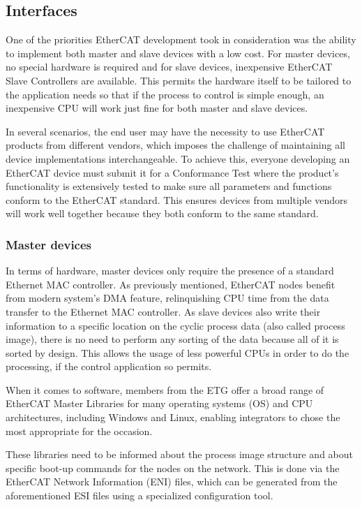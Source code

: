 \subsection{Interfaces}

One of the priorities EtherCAT development took in consideration was the ability to implement both master and slave devices with a low cost.
For master devices, no special hardware is required and for slave devices, inexpensive EtherCAT Slave Controllers are available.
This permits the hardware itself to be tailored to the application needs so that if the process to control is simple enough, an inexpensive CPU will work just fine for both master and slave devices.

In several scenarios, the end user may have the necessity to use EtherCAT products from different vendors, which imposes the challenge of maintaining all device implementations interchangeable.
To achieve this, everyone developing an EtherCAT device must submit it for a Conformance Test where the product's functionality is extensively tested to make sure all parameters and functions conform to the EtherCAT standard.
This ensures devices from multiple vendors will work well together because they both conform to the same standard.

\subsubsection{Master devices} \label{subsubsec:master_devices}

In terms of hardware, master devices only require the presence of a standard Ethernet MAC controller.
As previously mentioned, EtherCAT nodes benefit from modern system's DMA feature, relinquishing CPU time from the data transfer to the Ethernet MAC controller.
As slave devices also write their information to a specific location on the cyclic process data (also called process image), there is no need to perform any sorting of the data because all of it is sorted by design.
This allows the usage of less powerful CPUs in order to do the processing, if the control application so permits.

When it comes to software, members from the ETG offer a broad range of EtherCAT Master Libraries for many operating systems (OS) and CPU architectures, including Windows\textregistered{} and Linux\textregistered{}, enabling integrators to chose the most appropriate for the occasion.

These libraries need to be informed about the process image structure and about specific boot-up commands for the nodes on the network.
This is done via the EtherCAT Network Information (ENI) files, which can be generated from the aforementioned ESI files using a specialized configuration tool.

